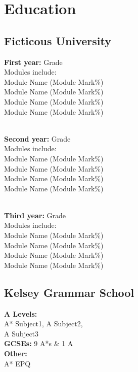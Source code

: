 
\section{Education} 

\subsection{Ficticous University}

\sectionspace %
\textbf{First year:} Grade \\
Modules include: \\
Module Name (Module Mark\%)\\
Module Name (Module Mark\%)\\
Module Name (Module Mark\%)\\
Module Name (Module Mark\%)\\
\sectionspace %

\\\textbf{Second year:} Grade \\
Modules include: \\
Module Name (Module Mark\%)\\
Module Name (Module Mark\%)\\
Module Name (Module Mark\%)\\
Module Name (Module Mark\%)\\
\sectionspace %

\\\textbf{Third year:} Grade \\
Modules include: \\
Module Name (Module Mark\%)\\
Module Name (Module Mark\%)\\
Module Name (Module Mark\%)\\
Module Name (Module Mark\%)\\
\vspace %
\sectionspace
\sectionspace


\subsection{Kelsey Grammar School}

\vspace{0.2cm}
\textbf{A Levels:}\\
A* Subject1, A Subject2, \\A Subject3\\
\sectionspace %
\textbf{GCSEs:} 9 A*s & 1 A\\
\sectionspace %
\textbf{Other:}\\
A* EPQ 
\sectionspace %

